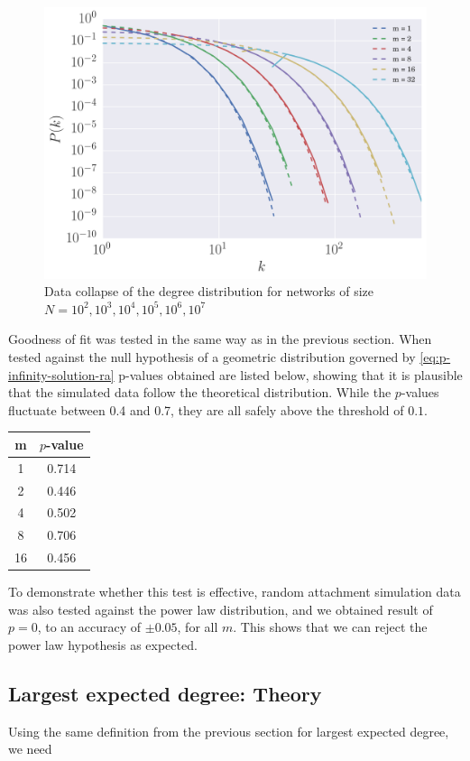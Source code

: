 \begin{figure}
    \centering
    \includegraphics[height=0.5\linewidth]{img/ra-fixed-n-logbin}
    \caption{Data collapse of the degree distribution for networks of size $N=10^2, 10^3, 10^4, 10^5, 10^6, 10^7$}
    \label{fig:ra-fixed-n-logbin}
\end{figure}

Goodness of fit was tested in the same way as in the previous section. When tested against the null hypothesis of a geometric distribution governed by \autoref{eq:p-infinity-solution-ra} p-values obtained are listed below, showing that it is plausible that the simulated data follow the theoretical distribution. While the $p$-values fluctuate between 0.4 and 0.7, they are all safely above the threshold of $0.1$. 

\begin{center}
\begin{tabular}{ c | c }
m & $p$-value \\
\hline
1  & 0.714 \\
2  & 0.446 \\
4  & 0.502 \\
8  & 0.706 \\
16 & 0.456 \\
\end{tabular}
\label{table:ra-ks-test}
\end{center}

To demonstrate whether this test is effective, random attachment simulation data was also tested against the power law distribution, and we obtained result of $p = 0$, to an accuracy of $\pm 0.05$, for all $m$. This shows that we can reject the power law hypothesis as expected. 

\subsection{Largest expected degree: Theory}\label{subsection:largest-expected-degree}
Using the same definition from the previous section for largest expected degree, we need

